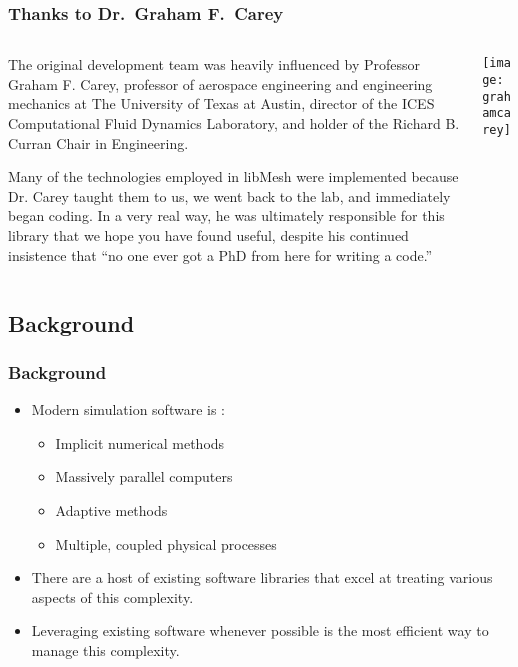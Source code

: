 \frame
{
  \frametitle{Thanks to Dr.\ Graham F.\ Carey}

  \begin{columns}
    \begin{column}{.55\textwidth}
      \scriptsize
The original development team was heavily influenced by Professor Graham F. Carey, professor of aerospace engineering and engineering mechanics at The University of Texas at Austin, director of the ICES Computational Fluid Dynamics Laboratory, and holder of the Richard B. Curran Chair in Engineering.

Many of the technologies employed in libMesh were implemented because Dr. Carey taught them to us, we went back to the lab, and immediately began coding. In a very real way, he was ultimately responsible for this library that we hope you have found useful, despite his continued insistence that ``no one ever got a PhD from here for writing a code.''       \normalsize
    \end{column}
    \begin{column}{.45\textwidth}
      \texttt{[image: grahamcarey]}
    \end{column}
  \end{columns}
}

\subsection{Background}
\frame
{
  \frametitle{Background}                 

  \begin{itemize}
  \item Modern simulation software is :
    \begin{itemize}
    \item Implicit numerical methods
    \item Massively parallel computers
    \item Adaptive methods
    \item Multiple, coupled physical processes
    \end{itemize}
  \item There are a host of existing software libraries that excel at treating various aspects of this complexity.
  \item Leveraging existing software whenever possible is the most efficient way to manage this complexity.

  \end{itemize}
}


